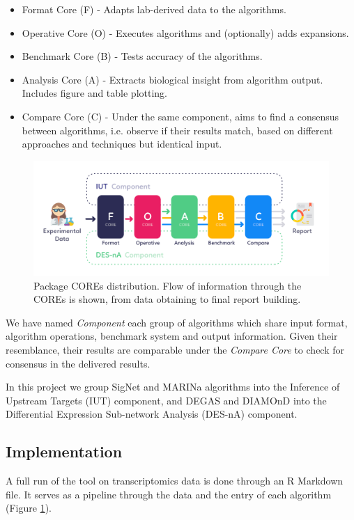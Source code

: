 \begin{itemize}
    \item Format Core (F) - Adapts lab-derived data to the algorithms.
    \item Operative Core (O) - Executes algorithms and (optionally) adds expansions.
    \item Benchmark Core (B) - Tests accuracy of the algorithms.
    \item Analysis Core (A) - Extracts biological insight from algorithm output. Includes figure and table plotting.
    \item Compare Core (C) - Under the same component, aims to find a consensus between algorithms, i.e. observe if their results match, based on different approaches and techniques but identical input.
\end{itemize}

\begin{figure}[!h]
    \centering
    \includegraphics[width=\linewidth]{Major Thesis/figures/art/workflow.png}
    \caption{Package COREs distribution. Flow of information through the COREs is shown, from data obtaining to final report building.}
    \label{fig:workflow}
\end{figure}

We have named \textit{Component} each group of algorithms which share input format, algorithm operations, benchmark system and output information. Given their resemblance, their results are comparable under the \textit{Compare Core} to check for consensus in the delivered results.

In this project we group SigNet and MARINa algorithms into the Inference of Upstream Targets (IUT) component, and DEGAS and DIAMOnD into the Differential Expression Sub-network Analysis (DES-nA) component.

\subsection{Implementation}
A full run of the tool on transcriptomics data is done through an R Markdown file. It serves as a pipeline through the data and the entry of each algorithm (Figure \ref{fig:workflow}).

